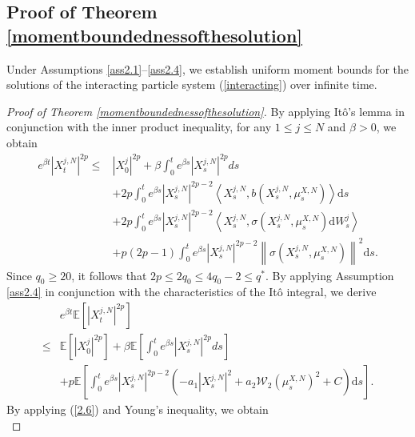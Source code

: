 \documentclass[12pt]{article}
\numberwithin{equation}{section}
\begin{document}
\subsection{Proof of Theorem \ref{momentboundednessofthesolution}}
Under Assumptions \ref{ass2.1}--\ref{ass2.4}, we establish uniform moment bounds for the solutions of the interacting particle system (\ref{interacting}) over infinite time.
\begin{proof}[Proof of Theorem \ref{momentboundednessofthesolution}] 
By applying It\^o's lemma in conjunction with the inner product inequality, for any $1\leq j\leq N$ and $\beta>0$, we obtain  
\begin{equation}\tag{5.19}\label{3.27}
\begin{aligned}
e^{\beta t}\left|X^{j,N}_{t}\right|^{2p} \leq & \left|X^j_0\right|^{2p}+\beta \int_0^t{e^{\beta s}\left|X^{j,N}_{s}\right|^{2p}ds}\\
&+2p \int_0^t{e^{\beta s}}\left|X^{j,N}_{s}\right|^{2p-2}\left\langle X^{j,N}_{s}, b\left( X^{j,N}_{s} ,\mu _{s}^{X,N} \right) 
\right\rangle \mathrm{d} s \\
& +2p \int_0^t{e^{\beta s}}\left|X^{j,N}_{s}\right|^{2p-2}\left\langle X^{j,N}_{s}, \sigma\left( X^{j,N}_{s} ,\mu _{s}^{X,N} \right)  \mathrm{d} W_s^j\right\rangle \\
& +p\left(2 p-1\right) \int_0^t{e^{\beta s}}\left|X^{j,N}_{s}\right|^{2p-2}\left\|\sigma\left( X^{j,N}_{s} ,\mu _{s}^{X,N} \right) \right\|^2 \mathrm{d} s.
\end{aligned}
\end{equation}
Since $q_0\geq 20$, it follows that $2p \leq 2q_0\leq 4q_0-2\leq q^*$.
By applying Assumption \ref{ass2.4} in conjunction with the characteristics of the It\^o integral, we derive
\begin{equation}\tag{5.20}\label{3.31}
\begin{aligned}
&e^{\beta t}\mathbb{E}\left[\left|X^{j,N}_{t}\right|^{2p}\right]\\
\leq&\mathbb{E}\left[\left|X_0^{j}\right|^{2p}\right]+\beta \mathbb{E}\left[\int_0^{t}{e^{\beta s}\left|X^{j,N}_{s}\right|^{2p}ds}\right]\\
&+p\mathbb{E}\left[\int_0^{t}{e^{\beta s}\left|X^{j,N}_{s}\right|^{2p-2}}\left( -a_1\left|X^{j,N}_{s}\right|^2+a_2\mathcal{W}_2\left( \mu _{s}^{X,N} \right) ^2+C \right) \mathrm{d}s\right].
\end{aligned}
\end{equation}
By applying (\ref{2.6}) and Young's inequality, we obtain
\begin{equation}\tag{5.21}\label{3.32}

\end{equation}
\end{proof}
\end{document}
